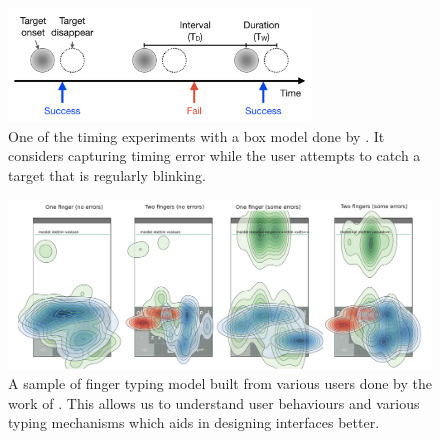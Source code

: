 \documentclass{article}
\begin{document}
\begin{itemize}
\begin{figure}[htbp]
\centering
 \includegraphics[width=8cm]{figures/boxmodel.png}
    \caption{One of the timing experiments with a box model done by \cite{lee2017boxer}. It considers capturing timing error while the user attempts to catch a target that is regularly blinking.
 }\label{fig:boxmodel}
\end{figure}

\begin{figure}[htbp]
\centering
 \includegraphics[width=12cm]{figures/fingermodel.png}
    \caption{A sample of finger typing model built from various users done by the work of \cite{jiangwe}. This allows us to understand user behaviours and various typing mechanisms which aids in designing interfaces better.
 }\label{fig:fingermodel}
\end{figure}


\end{itemize}
\end{document}
